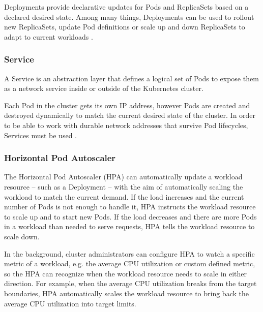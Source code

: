 Deployments provide declarative updates for Pods and ReplicaSets based on a declared desired state. Among many things, Deployments can be used to rollout new ReplicaSets, update Pod definitions or scale up and down ReplicaSets to adapt to current workloads \cite{KubernetesDeployment}.

\subsubsection{Service} \label{k8s-service}

A Service is an abstraction layer that defines a logical set of Pods to expose them as a network service inside or outside of the Kubernetes cluster.

Each Pod in the cluster gets its own IP address, however Pods are created and destroyed dynamically to match the current desired state of the cluster. In order to be able to work with durable network addresses that survive Pod lifecycles, Services must be used \cite{KubernetesService}.


\subsubsection{Horizontal Pod Autoscaler} \label{k8s-hpa}

The Horizontal Pod Autoscaler (HPA) can automatically update a workload resource -- such as a Deployment -- with the aim of automatically scaling the workload to match the current demand. If the load increases and the current number of Pods is not enough to handle it, HPA instructs the workload resource to scale up and to start new Pods. If the load decreases and there are more Pods in a workload than needed to serve requests, HPA tells the workload resource to scale down.

In the background, cluster administrators can configure HPA to watch a specific metric of a workload, e.g. the average CPU utilization or custom defined metric, so the HPA can recognize when the workload resource needs to scale in either direction. For example, when the average CPU utilization breaks from the target boundaries, HPA automatically scales the workload resource to bring back the average CPU utilization into target limits.

